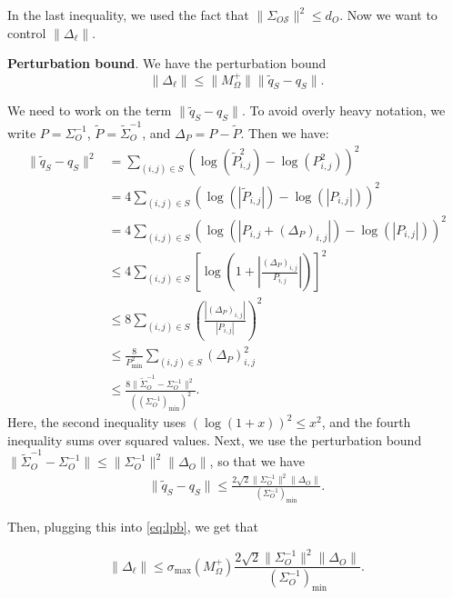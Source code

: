 \documentclass[letterpaper]{article}
\begin{document}
\begin{appendix}
In the last inequality, we used the fact that $\|\Sigma_{O\mathcal{S}}\|^2 \leq d_O$. Now we want to control $\|\Delta_{\ell}\|$.  

{\bf Perturbation bound}. We have the perturbation bound
\begin{equation}
 \|\Delta_{\ell}\| \leq \|M_\Omega^+\| \|\tilde{q}_S - q_S\|.
\label{eq:lpb}
 \end{equation}

We need to work on the term $\|\tilde{q}_S - q_S \|$. To avoid overly heavy notation, we write $P = \Sigma_O^{-1}$, $\tilde{P} = \tilde{\Sigma}_O^{-1}$, and $\Delta_P = P - \tilde{P}$. 
Then we have:
\begin{align*}
	\|\tilde{q}_S-q_S\|^2
	&=
	\sum_{(i,j)\in S} \left( \log(\tilde{P}_{i,j}^2) - \log(P_{i,j}^2) \right)^2 \\
	&=
	4 \sum_{(i,j)\in S} \left( \log(|\tilde{P}_{i,j}|) - \log(|P_{i,j}|) \right)^2 \\
	&= 
	4 \sum_{(i,j)\in S} \left( \log(|P_{i,j} + (\Delta_P)_{i,j}|) - \log(|P_{i,j}|) \right)^2 \\
	&\leq
	4 \sum_{(i,j)\in S} \left[ \log \left(1 + \left|\frac{(\Delta_P)_{i,j}}{P_{i,j}} \right| \right)\right]^2  \\
	&\leq 
	8 \sum_{(i,j) \in S} \left( \frac{|(\Delta_P)_{i,j}|}{|P_{i,j}|} \right)^2  \\
	&\leq 
	\frac{8}{P^2_{\min}} \sum_{(i,j) \in S} (\Delta_P)_{i,j}^2 \\
	&\leq
	\frac{8 \|\tilde{\Sigma}_O^{-1}-\Sigma_O^{-1}\|^2}{((\Sigma_O^{-1})_{\min})^2}.
\end{align*}
Here, the second inequality uses $(\log(1+x))^2 \leq x^2$, and the fourth inequality sums over squared values. Next, we use the perturbation bound $\|\tilde{\Sigma}_O^{-1} - \Sigma_O^{-1}\| \leq \|\Sigma_O^{-1}\|^2 \|\Delta_O\|$, so that we have 
\begin{align*}
\|\tilde{q}_S-q_S\| \leq\frac{2\sqrt{2} \|\Sigma_O^{-1}\|^2\|\Delta_O\|}{(\Sigma_O^{-1})_{\min}}.
\end{align*}

Then, plugging this into \eqref{eq:lpb}, we get that

\begin{equation}
	\|\Delta_{\ell}\|
	\leq
	\sigma_{\max}(M_\Omega^+)
	\frac{ 2\sqrt{2}\|\Sigma_O^{-1}\|^2 \|\Delta_O\|}{(\Sigma_O^{-1})_{\min}}.
\label{eq:ellbound}
\end{equation}


\end{appendix}
\end{document}
